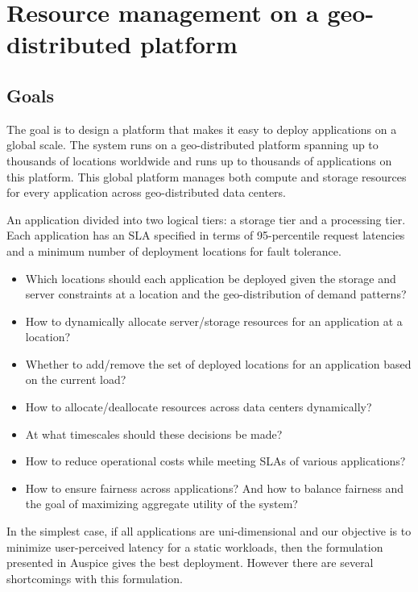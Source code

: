 \chapter{Resource management on a  geo-distributed platform}

\section{Goals}

The goal is to design a platform that makes it easy to deploy applications on a global scale. The system runs on a geo-distributed platform spanning up to thousands of locations worldwide and runs up to thousands of applications on this platform. This global platform manages both compute and storage resources for every application across geo-distributed data centers.  

An application divided into two logical tiers: a storage tier  and a processing tier. Each application has an SLA specified in terms of 95-percentile request latencies and a minimum number of deployment locations for fault tolerance. 


\begin{itemize}
\item
Which locations should each application be deployed given the storage and server constraints at a location and the geo-distribution of demand patterns?
\item
How to dynamically allocate server/storage resources for an application at a location?
\item
Whether to add/remove the set of deployed locations for an application based on the current load?
\item
How to allocate/deallocate resources across data centers dynamically?
\item
At what timescales should these decisions be made?
\item
How to reduce operational costs while meeting SLAs of various applications?
\item
How to ensure fairness across applications? And how to balance fairness and the goal of maximizing aggregate utility of the system?
\end{itemize}


In the simplest case, if all applications are uni-dimensional and our objective is to minimize user-perceived latency for a static workloads, then the formulation presented in Auspice \cite{auspice} gives the best deployment. However there are several shortcomings with this formulation. 

